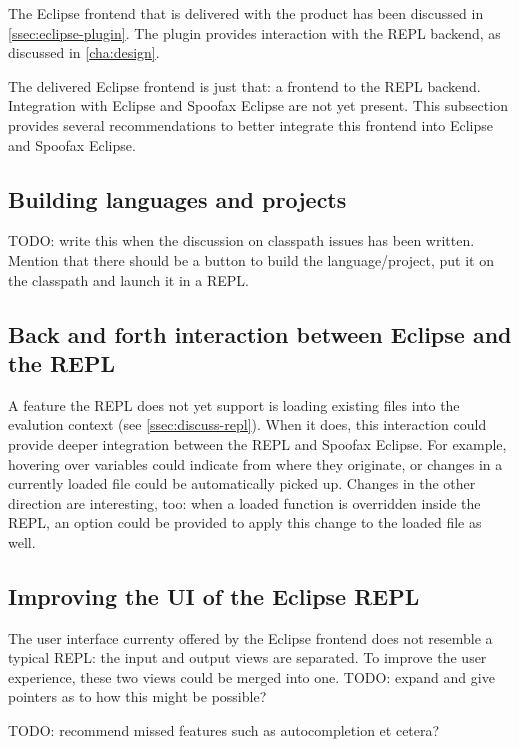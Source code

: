 The Eclipse frontend that is delivered with the product has been discussed in
\cref{ssec:eclipse-plugin}. The plugin provides interaction with the REPL
backend, as discussed in \cref{cha:design}.

The delivered Eclipse frontend is just that: a frontend to the REPL backend.
Integration with Eclipse and Spoofax Eclipse are not yet present. This
subsection provides several recommendations to better integrate this frontend
into Eclipse and Spoofax Eclipse.

\subsection{Building languages and projects}

TODO: write this when the discussion on classpath issues has been written.
Mention that there should be a button to build the language/project, put it on
the classpath and launch it in a REPL.

\subsection{Back and forth interaction between Eclipse and the REPL}

A feature the REPL does not yet support is loading existing files into the
evalution context (see \cref{ssec:discuss-repl}). When it does, this interaction
could provide deeper integration between the REPL and Spoofax Eclipse. For
example, hovering over variables could indicate from where they originate, or
changes in a currently loaded file could be automatically picked up. Changes in
the other direction are interesting, too: when a loaded function is overridden
inside the REPL, an option could be provided to apply this change to the loaded
file as well.

\subsection{Improving the UI of the Eclipse REPL}

The user interface currenty offered by the Eclipse frontend does not resemble a
typical REPL: the input and output views are separated. To improve the user
experience, these two views could be merged into one. TODO: expand and give
pointers as to how this might be possible?

TODO: recommend missed features such as autocompletion et cetera?

